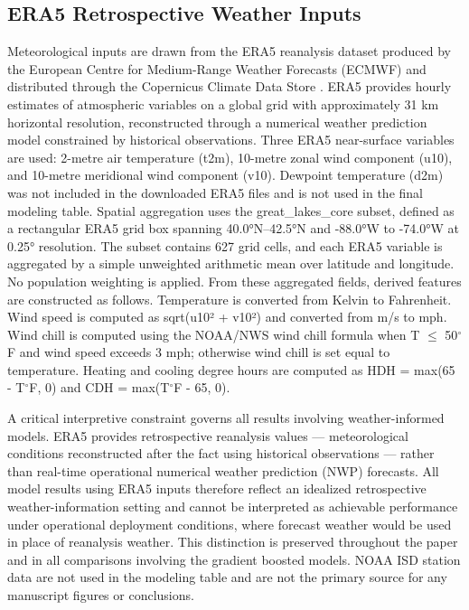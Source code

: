\documentclass[12pt,a4paper]{article}
\begin{document}
\subsection{ERA5 Retrospective Weather Inputs}
Meteorological inputs are drawn from the ERA5 reanalysis dataset produced by the European Centre for Medium-Range Weather Forecasts (ECMWF) and distributed through the Copernicus Climate Data Store \cite{hersbach2020era5}. ERA5 provides hourly estimates of atmospheric variables on a global grid with approximately 31 km horizontal resolution, reconstructed through a numerical weather prediction model constrained by historical observations.
Three ERA5 near-surface variables are used: 2-metre air temperature (t2m), 10-metre zonal wind component (u10), and 10-metre meridional wind component (v10). Dewpoint temperature (d2m) was not included in the downloaded ERA5 files and is not used in the final modeling table.
Spatial aggregation uses the great\_lakes\_core subset, defined as a rectangular ERA5 grid box spanning 40.0°N–42.5°N and -88.0°W to -74.0°W at 0.25° resolution. The subset contains 627 grid cells, and each ERA5 variable is aggregated by a simple unweighted arithmetic mean over latitude and longitude. No population weighting is applied.
From these aggregated fields, derived features are constructed as follows. Temperature is converted from Kelvin to Fahrenheit. Wind speed is computed as sqrt(u10² + v10²) and converted from m/s to mph. Wind chill is computed using the NOAA/NWS wind chill formula when T $\leq$ 50$^\circ$F and wind speed exceeds 3 mph; otherwise wind chill is set equal to temperature. Heating and cooling degree hours are computed as HDH = max(65 - T$^\circ$F, 0) and CDH = max(T$^\circ$F - 65, 0).


A critical interpretive constraint governs all results involving weather-informed models. ERA5 provides retrospective reanalysis values --- meteorological conditions reconstructed after the fact using historical observations --- rather than real-time operational numerical weather prediction (NWP) forecasts. All model results using ERA5 inputs therefore reflect an idealized retrospective weather-information setting and cannot be interpreted as achievable performance under operational deployment conditions, where forecast weather would be used in place of reanalysis weather. This distinction is preserved throughout the paper and in all comparisons involving the gradient boosted models.
NOAA ISD station data are not used in the modeling table and are not the primary source for any manuscript figures or conclusions.
\end{document}
